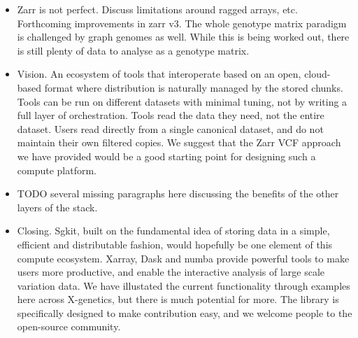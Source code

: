 \documentclass[a4paper,num-refs]{oup-contemporary}
\begin{document}
\begin{itemize}
\item Zarr is not perfect. Discuss limitations around ragged arrays,
etc. Forthcoming improvements in zarr v3. The whole genotype matrix
paradigm is challenged by graph genomes as well. While this is
being worked out, there is still plenty of data to analyse as a
genotype matrix.

\item Vision. An ecosystem of tools that interoperate
based on an open, cloud-based format where distribution is naturally
managed by the stored chunks. Tools can be run on different datasets
with minimal tuning, not by writing a full layer of orchestration.
Tools read the data they need, not the entire dataset. Users read
directly from a single canonical dataset, and do not maintain
their own filtered copies. We suggest that the Zarr VCF approach
we have provided would be a good starting point for designing
such a compute platform.

\item TODO several missing paragraphs here discussing the
benefits of the other layers of the stack.

\item Closing. Sgkit, built on the fundamental idea of storing
data in a simple, efficient and distributable fashion, would
hopefully be one element of this compute ecosystem.
Xarray, Dask and numba provide powerful tools to make users
more productive, and enable the interactive analysis of large
scale variation data. We have illustated the current functionality
through examples here across X-genetics, but there is much
potential for more. The library is specifically designed to make
contribution easy, and we welcome people to the open-source
community.

\end{itemize}



\end{document}

